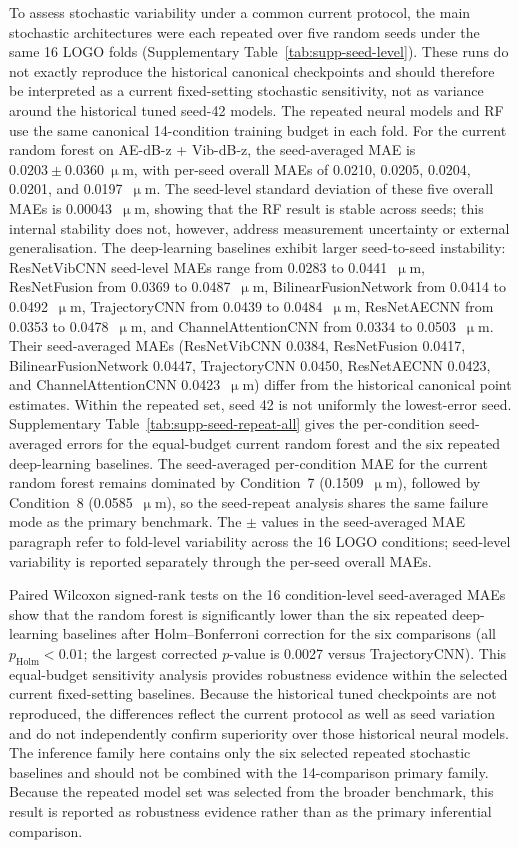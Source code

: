 To assess stochastic variability under a common current protocol, the main stochastic architectures
were each repeated over five random seeds under the same 16 LOGO folds
(Supplementary Table~\ref{tab:supp-seed-level}). These runs do not exactly
reproduce the historical canonical checkpoints and should therefore be
interpreted as a current fixed-setting stochastic sensitivity, not as variance
around the historical tuned seed-42 models. The repeated neural models
and RF use the same canonical 14-condition training budget in each fold. For
the current random forest on AE-dB-z + Vib-dB-z, the seed-averaged MAE is
\(0.0203 \pm 0.0360~\upmu\)m, with per-seed overall MAEs of 0.0210,
0.0205, 0.0204, 0.0201, and 0.0197~\(\upmu\)m. The seed-level standard
deviation of these five overall MAEs is 0.00043~\(\upmu\)m, showing
that the RF result is stable across seeds; this internal stability does
not, however, address measurement uncertainty or external generalisation. The deep-learning baselines
exhibit larger seed-to-seed instability: ResNetVibCNN seed-level MAEs
range from 0.0283 to 0.0441~\(\upmu\)m, ResNetFusion from 0.0369 to
0.0487~\(\upmu\)m, BilinearFusionNetwork from 0.0414 to 0.0492~\(\upmu\)m,
TrajectoryCNN from 0.0439 to 0.0484~\(\upmu\)m, ResNetAECNN from 0.0353 to
0.0478~\(\upmu\)m, and ChannelAttentionCNN from 0.0334 to 0.0503~\(\upmu\)m.
Their seed-averaged MAEs (ResNetVibCNN 0.0384, ResNetFusion 0.0417,
BilinearFusionNetwork 0.0447, TrajectoryCNN 0.0450, ResNetAECNN 0.0423,
and ChannelAttentionCNN 0.0423~\(\upmu\)m) differ from the historical
canonical point estimates. Within the repeated set, seed 42 is not uniformly
the lowest-error seed. Supplementary
Table~\ref{tab:supp-seed-repeat-all} gives the per-condition
seed-averaged errors for the equal-budget current random forest and the six
repeated deep-learning baselines. The seed-averaged per-condition
MAE for the current random forest remains dominated by Condition~7
(0.1509~\(\upmu\)m), followed by Condition~8 (0.0585~\(\upmu\)m), so the
seed-repeat analysis shares the same failure mode as the primary
benchmark. The $\pm$ values in the seed-averaged MAE paragraph refer to
fold-level variability across the 16 LOGO conditions; seed-level
variability is reported separately through the per-seed overall MAEs.

Paired Wilcoxon signed-rank tests on the 16 condition-level seed-averaged
MAEs show that the random forest is significantly lower than the six
repeated deep-learning baselines after Holm--Bonferroni correction for the
six comparisons (all \(p_{\text{Holm}} < 0.01\); the largest corrected
\(p\)-value is 0.0027 versus TrajectoryCNN). This equal-budget sensitivity analysis
provides robustness evidence within the selected current fixed-setting
baselines. Because the historical tuned checkpoints are not reproduced, the
differences reflect the current protocol as well as seed variation and do not
independently confirm superiority over those historical neural models. The inference
family here contains only the six selected repeated stochastic baselines
and should not be combined with the 14-comparison primary family. Because
the repeated model set was selected from the broader benchmark, this
result is reported as robustness evidence rather than as the primary
inferential comparison.

